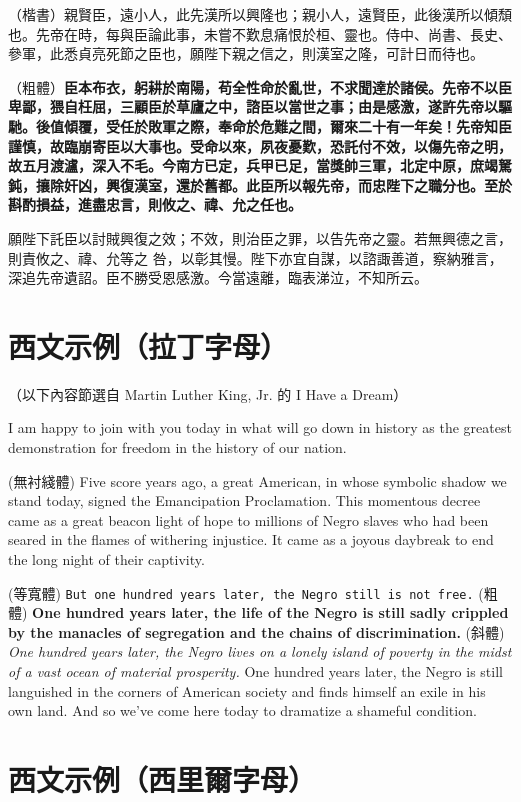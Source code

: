 \documentclass[
oneside,
12pt,
]{book}
\begin{document}
（楷書）{\kaishu 親賢臣，遠小人，此先漢所以興隆也；親小人，遠賢臣，此後漢所以傾頹也。先帝在時，每與臣論此事，未嘗不歎息痛恨於桓、靈也。侍中、尚書、長史、參軍，此悉貞亮死節之臣也，願陛下親之信之，則漢室之隆，可計日而待也。}

（粗體）\textbf{臣本布衣，躬耕於南陽，苟全性命於亂世，不求聞達於諸侯。先帝不以臣卑鄙，猥自枉屈，三顧臣於草廬之中，諮臣以當世之事；由是感激，遂許先帝以驅馳。後值傾覆，受任於敗軍之際，奉命於危難之間，爾來二十有一年矣！先帝知臣謹慎，故臨崩寄臣以大事也。受命以來，夙夜憂歎，恐託付不效，以傷先帝之明，故五月渡瀘，深入不毛。今南方已定，兵甲已足，當獎帥三軍，北定中原，庶竭駑鈍，攘除奸凶，興復漢室，還於舊都。此臣所以報先帝，而忠陛下之職分也。至於斟酌損益，進盡忠言，則攸之、禕、允之任也。}

願陛下託臣以討賊興復之效；不效，則治臣之罪，以告先帝之靈。若無興德之言，則責攸之、禕、允等之 咎，以彰其慢。陛下亦宜自謀，以諮諏善道，察納雅言，深追先帝遺詔。臣不勝受恩感激。今當遠離，臨表涕泣，不知所云。

\section{西文示例（拉丁字母）}

（以下內容節選自 Martin Luther King, Jr. 的 I Have a Dream）

I am happy to join with you today in what will go down in history as the greatest demonstration for freedom in the history of our nation.

(無衬綫體) \textsf{Five score years ago, a great American, in whose symbolic shadow we stand today, signed the Emancipation Proclamation. This momentous decree came as a great beacon light of hope to millions of Negro slaves who had been seared in the flames of withering injustice. It came as a joyous daybreak to end the long night of their captivity.}

(等寬體) \texttt{But one hundred years later, the Negro still is not free.} (粗體) \textbf{One hundred years later, the life of the Negro is still sadly crippled by the manacles of segregation and the chains of discrimination.} (斜體) \textit{One hundred years later, the Negro lives on a lonely island of poverty in the midst of a vast ocean of material prosperity.} One hundred years later, the Negro is still languished in the corners of American society and finds himself an exile in his own land. And so we've come here today to dramatize a shameful condition.

\section{西文示例（西里爾字母）}
\end{document}
